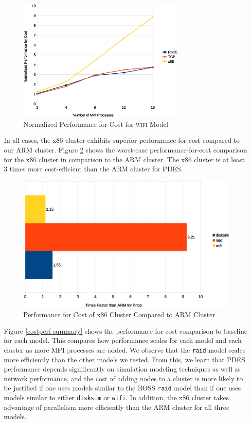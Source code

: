 \documentclass[11pt]{book}
\begin{document}
\begin{figure}
\centering
\includegraphics[width=0.75\textwidth]{wifi_costperf}
\caption{Normalized Performance for Cost for \textsc{wifi} Model}\label{wifi-costperf} 
\end{figure}

In all cases, the x86 cluster exhibits superior performance-for-cost compared to our ARM
cluster.  Figure \ref{costperf} shows the worst-case performance-for-cost comparison for
the x86 cluster in comparison to the ARM cluster.  The x86 cluster is at least 3 times
more cost-efficient than the ARM cluster for PDES.

\begin{figure}
\centering
\includegraphics[width=\textwidth]{costperf}
\caption{Performance for Cost of x86 Cluster Compared to ARM Cluster}
\label{costperf}
\end{figure}

Figure \ref{costperf-summary} shows the performance-for-cost comparison to baseline for
each model.  This compares how performance scales for each model and each cluster as more
MPI processes are added.  We observe that the \verb;raid; model scales more efficiently
than the other models we tested.  From this, we learn that PDES performance depends
significantly on simulation modeling techniques as well as network performance, and the
cost of adding nodes to a cluster is more likely to be justified if one uses models
similar to the ROSS \verb;raid; model than if one uses models similar to either
\verb;disksim; or \verb;wifi;.  In addition, the x86 cluster takes advantage of
parallelism more efficiently than the ARM cluster for all three models.
\end{document}
